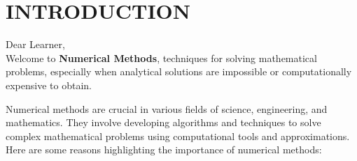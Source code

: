 \modulenumber{}









\section{INTRODUCTION}
Dear Learner,\\
Welcome to {\bf Numerical Methods}, techniques for solving mathematical problems, especially when analytical solutions are impossible or computationally expensive to obtain.

Numerical methods are crucial in various fields of science, engineering, and mathematics. They involve developing algorithms and techniques to solve complex mathematical problems using computational tools and approximations. Here are some reasons highlighting the importance of numerical methods:
